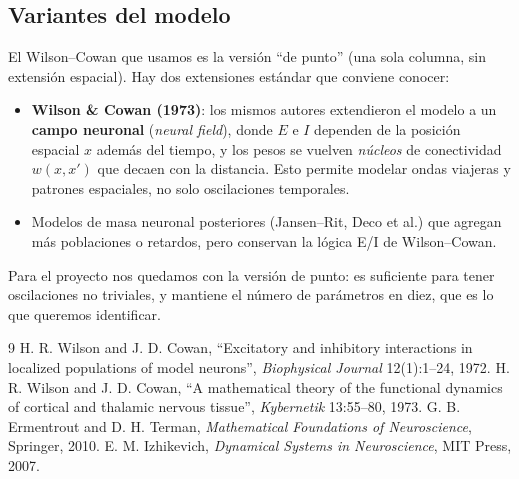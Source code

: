\documentclass[11pt,a4paper]{article}
\begin{document}
\subsection{Variantes del modelo}
El Wilson--Cowan que usamos es la versión ``de punto'' (una sola columna, sin extensión espacial). Hay dos extensiones estándar que conviene conocer:
\begin{itemize}[nosep]
    \item \textbf{Wilson \& Cowan (1973)}: los mismos autores extendieron el modelo a un \textbf{campo neuronal} (\emph{neural field}), donde $E$ e $I$ dependen de la posición espacial $x$ además del tiempo, y los pesos se vuelven \emph{núcleos} de conectividad $w(x,x')$ que decaen con la distancia. Esto permite modelar ondas viajeras y patrones espaciales, no solo oscilaciones temporales.
    \item Modelos de masa neuronal posteriores (Jansen--Rit, Deco et al.) que agregan más poblaciones o retardos, pero conservan la lógica E/I de Wilson--Cowan.
\end{itemize}
Para el proyecto nos quedamos con la versión de punto: es suficiente para tener oscilaciones no triviales, y mantiene el número de parámetros en diez, que es lo que queremos identificar.

\begin{thebibliography}{9}
 H. R. Wilson and J. D. Cowan, ``Excitatory and inhibitory interactions in localized populations of model neurons'', \emph{Biophysical Journal} 12(1):1--24, 1972.
 H. R. Wilson and J. D. Cowan, ``A mathematical theory of the functional dynamics of cortical and thalamic nervous tissue'', \emph{Kybernetik} 13:55--80, 1973.
 G. B. Ermentrout and D. H. Terman, \emph{Mathematical Foundations of Neuroscience}, Springer, 2010.
 E. M. Izhikevich, \emph{Dynamical Systems in Neuroscience}, MIT Press, 2007.
\end{thebibliography}
\end{document}
